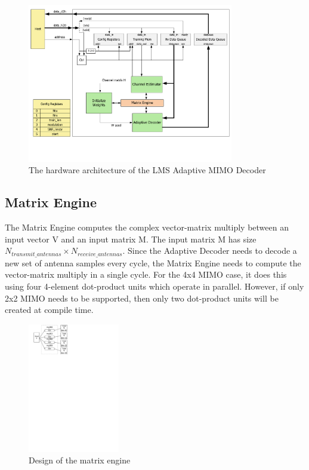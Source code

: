 \documentclass[journal]{IEEEtran}
\begin{document}
\begin{figure}[!h]
\centering
\includegraphics*[width=9cm, viewport = 0 90 789 600]{images/top_level_arch.pdf}
\caption{The hardware architecture of the LMS Adaptive MIMO Decoder}
\label{top_level_arch}
\end{figure}

\subsection{Matrix Engine}

The Matrix Engine computes the complex vector-matrix multiply between an input vector V and an input matrix M. The input matrix M has size $N_{transmit\_antennas} \times N_{receive\_antennas}$. Since the Adaptive Decoder needs to decode a new set of antenna samples every cycle, the Matrix Engine needs to compute the vector-matrix multiply in a single cycle. For the 4x4 MIMO case, it does this using four 4-element dot-product units which operate in parallel. However, if only 2x2 MIMO needs to be supported, then only two dot-product units will be created at compile time.

\begin{figure}[!h]
\centering
\includegraphics*[width=4cm, viewport = 30 640 260 840]{images/matrix_engine.pdf}
\caption{Design of the matrix engine}
\label{matrix_engine}
\end{figure}
\end{document}
